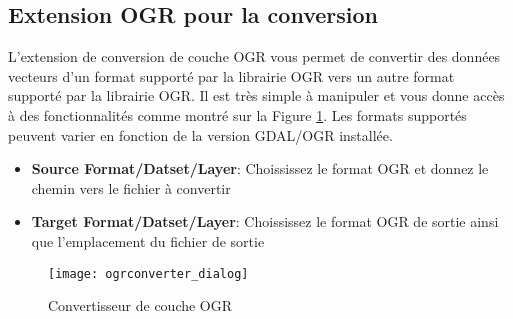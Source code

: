 
\subsection{Extension OGR pour la conversion}

L'extension de conversion de couche OGR vous permet de convertir des données vecteurs d'un format supporté par la librairie OGR
vers un autre format supporté par la librairie OGR. Il est très simple à manipuler et vous donne accès à des fonctionnalités
comme montré sur la Figure \ref{fig:ogrconverter_dialog}. Les formats supportés peuvent varier en fonction de la version GDAL/OGR installée.


\begin{itemize}
\item \textbf{Source Format/Datset/Layer}: Choississez le format OGR et donnez le chemin vers le fichier à convertir
\item \textbf{Target Format/Datset/Layer}: Choississez le format OGR de sortie ainsi que l'emplacement du fichier de sortie
\end{itemize}

\begin{figure}[ht]
   \begin{center}
   \caption{Convertisseur de couche OGR \nixcaption}\label{fig:ogrconverter_dialog}\smallskip
   \texttt{[image: ogrconverter\_dialog]}
\end{center}  
\end{figure}

